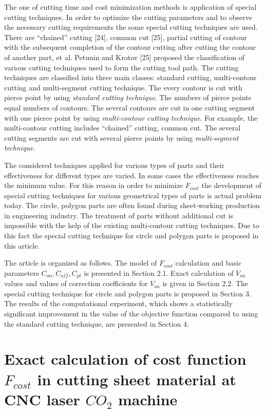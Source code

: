\documentclass[runningheads]{llncs}
\begin{document}
The one of cutting time and cost minimization methods is
application of special cutting techniques.
In order to optimize the cutting parameters
and to observe the necessary cutting requirements
the some special cutting techniques are used.
There are ``chained'' cutting [24],
common cut [25], partial cutting of contour
with the subsequent completion of the contour cutting
after cutting the contour of another part, et al.
Petunin and Krotov [25] proposed the
classification of various cutting techniques
used to form the cutting tool path.
The cutting techniques are classified into three main classes:
standard cutting, multi-contour cutting and multi-segment cutting technique.
The every contour is cut with pierce point by using
\textit{standard cutting technique}.
The numbers of pierce points equal numbers of contours.
The several contours are cut in one cutting segment
with one pierce point by using
\textit{multi-contour cutting technique}.
For example, the multi-contour cutting includes ``chained'' cutting, common cut.
The several cutting segments are cut with several pierce points by using
\textit{multi-segment technique}.

The considered techniques applied for various types of parts
and their effectiveness for different types are varied.
In some cases the effectiveness reaches the minimum value.
For this reason in order to minimize $F_{cost}$
the development of special cutting techniques
for various geometrical types of parts is actual problem today.
The circle, polygon parts are often found during sheet-working production
in engineering industry.
The treatment of parts without additional cut is impossible
with the help of the existing multi-contour cutting techniques.
Due to this fact the special cutting technique
for circle and polygon parts is proposed in this article.

The article is organized as follows.
The model of $F_{cost}$
calculation and basic parameters
$C_{on}, C_{off}, C_{pt}$
is presented in Section 2.1.
Exact calculation of $V_{on}$
values and values of correction coefficients for $V_{on}$
is given in Section 2.2.
The special cutting technique for circle and polygon parts
is proposed in Section 3.
The results of the computational experiment,
which shows a statistically significant improvement
in the value of the objective function
compared to using the standard cutting technique,
are presented in Section 4.

\section{Exact calculation of cost function $F_{cost}$ in cutting sheet material at CNC laser $CO_2$ machine}
\end{document}
